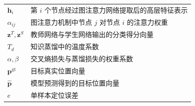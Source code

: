 \begin{nomenclature}
\begin{longtable}{p{3.2cm}p{10.8cm}}
  \(\mathbf{h}_i\) & 第 \(i\) 个节点经过图注意力网络提取后的高层特征表示 \\
  \(\alpha_{ij}\) & 图注意力机制中节点 \(j\) 对节点 \(i\) 的注意力权重 \\
  \(\mathbf{z}^{T},\mathbf{z}^{S}\) & 教师网络与学生网络输出的分类得分向量 \\
  \(T_d\) & 知识蒸馏中的温度系数 \\
  \(\alpha,\beta\) & 交叉熵损失与蒸馏损失的权重系数 \\
  \(\mathbf{p}^{\mathrm{gt}}\) & 目标真实位置向量 \\
  \(\hat{\mathbf{p}}\) & 模型预测得到的目标位置向量 \\
  \(e\) & 单样本定位误差 \\
\end{longtable}

\end{nomenclature}
\clearpage
\thispagestyle{empty}
\mbox{}
\clearpage
